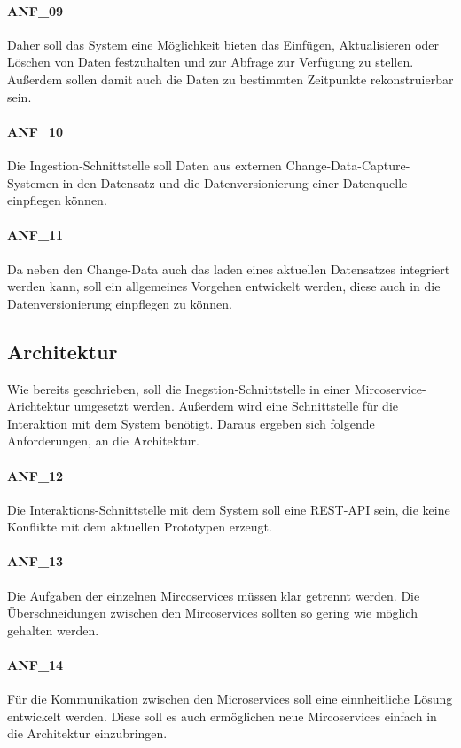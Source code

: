\paragraph{ANF\_09}
Daher soll das System eine Möglichkeit bieten das Einfügen, Aktualisieren oder Löschen von Daten festzuhalten und zur Abfrage zur Verfügung zu stellen.
Außerdem sollen damit auch die Daten zu bestimmten Zeitpunkte rekonstruierbar sein.

\paragraph{ANF\_10}
Die Ingestion-Schnittstelle soll Daten aus externen Change-Data-Capture-Systemen in den Datensatz und die Datenversionierung einer Datenquelle einpflegen können.

\paragraph{ANF\_11}
Da neben den Change-Data auch das laden eines aktuellen Datensatzes integriert werden kann, soll ein allgemeines Vorgehen entwickelt werden, diese auch in die Datenversionierung einpflegen zu können.

\subsection{Architektur}
Wie bereits geschrieben, soll die Inegstion-Schnittstelle in einer Mircoservice-Arichtektur umgesetzt werden.
Außerdem wird eine Schnittstelle für die Interaktion mit dem System benötigt.
Daraus ergeben sich folgende Anforderungen, an die Architektur.

\paragraph{ANF\_12}
Die Interaktions-Schnittstelle mit dem System soll eine REST-API sein, die keine Konflikte mit dem aktuellen Prototypen erzeugt.

\paragraph{ANF\_13}
Die Aufgaben der einzelnen Mircoservices müssen klar getrennt werden.
Die Überschneidungen zwischen den Mircoservices sollten so gering wie möglich gehalten werden.

\paragraph{ANF\_14}
Für die Kommunikation zwischen den Microservices soll eine einnheitliche Lösung entwickelt werden.
Diese soll es auch ermöglichen neue Mircoservices einfach in die Architektur einzubringen.

